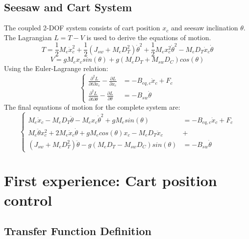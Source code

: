 \documentclass[11pt,a4paper]{article}
\begin{document}
\subsection{Seesaw and Cart System}
The coupled 2-DOF system consists of cart position $x_c$ and seesaw inclination $\theta$. The Lagrangian $L = T - V$ is used to derive the equations of motion.
\begin{equation}
	T = \frac{1}{2}M_e \dot{x}_c^2 + \frac{1}{2}(J_{sw} + M_eD_T^2)\dot{\theta}^2 + \frac{1}{2}M_ex_c^2 \dot{\theta}^2 - M_eD_T \dot{x}_c \dot{\theta}
\end{equation}
\begin{equation}
	V = gM_ex_csin(\theta) + g(M_eD_T + M_{sw}D_C )cos(\theta)
\end{equation}
Using the Euler-Lagrange relation:\\
\begin{equation}
	\left\{
	\begin{aligned}
		\frac{\partial^2L}{\partial t \partial \dot{x}_c} - \frac{\partial L}{\partial x_c}       & = - B_{eq,c} \dot{x}_c + F_c \\
		\frac{\partial^2L}{\partial t \partial \dot{\theta}} - \frac{\partial L}{\partial \theta} & = - B_{sw} \dot{\theta}
	\end{aligned}
	\right.
\end{equation}
The final equations of motion for the complete system are:
\begin{equation}
	\label{eq:seesaw_eom}
	\left\{
	\begin{aligned}
		M_e\dot{x}_c - M_eD_T \ddot{\theta} - M_e x_c \dot{\theta}^2 + gM_e sin(\theta)                 & = - B_{eq,c} \dot{x}_c + F_c \\
		M_e \ddot{\theta} x_c^2 + 2M_e \dot{x}_c \dot{\theta} + gM_ecos(\theta)x_c - M_e D_T \ddot{x}_c & +                            \\
		(J_{sw} + M_eD^2_T)\ddot{\theta} - g(M_eD_T - M_{sw}D_C)sin(\theta)                             & = - B_{sw} \dot{\theta}
	\end{aligned}
	\right.
\end{equation}

\section{First experience: Cart position control}

\subsection{Transfer Function Definition}
\end{document}
